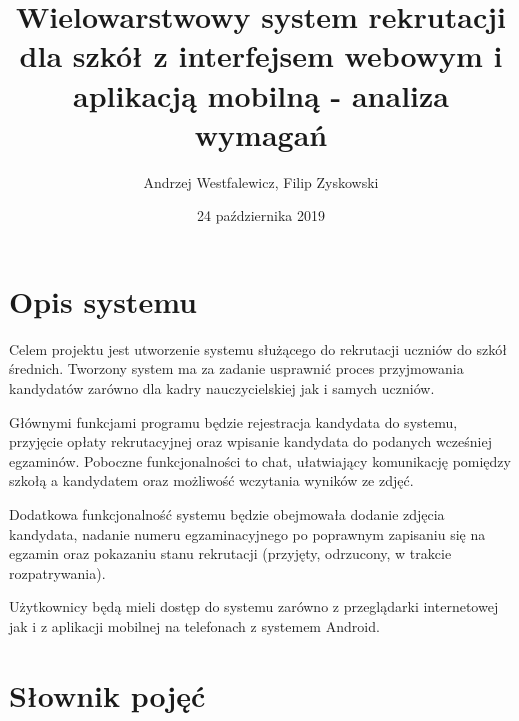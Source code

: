 \documentclass{article}
\title{Wielowarstwowy system rekrutacji dla szkół z interfejsem webowym i aplikacją mobilną - analiza wymagań}
\author{Andrzej Westfalewicz, Filip Zyskowski}
\date{24 października 2019}
\begin{document}
\begin{titlepage}
\maketitle
\end{titlepage}

\tableofcontents

\pagebreak

\section{Opis systemu}

Celem projektu jest utworzenie systemu służącego do rekrutacji uczniów do szkół średnich. Tworzony system ma za zadanie usprawnić proces przyjmowania kandydatów zarówno dla kadry nauczycielskiej jak i samych uczniów.

Głównymi funkcjami programu będzie rejestracja kandydata do systemu, przyjęcie opłaty rekrutacyjnej oraz wpisanie kandydata do podanych wcześniej egzaminów. Poboczne funkcjonalności to chat, ułatwiający komunikację pomiędzy szkołą a kandydatem oraz możliwość wczytania wyników ze zdjęć.

Dodatkowa funkcjonalność systemu będzie obejmowała dodanie zdjęcia kandydata, nadanie numeru egzaminacyjnego po poprawnym zapisaniu się na egzamin oraz pokazaniu stanu rekrutacji (przyjęty, odrzucony, w trakcie rozpatrywania).

Użytkownicy będą mieli dostęp do systemu zarówno z przeglądarki internetowej jak i z aplikacji mobilnej na telefonach z systemem Android.

\section{Słownik pojęć}
\end{document}
